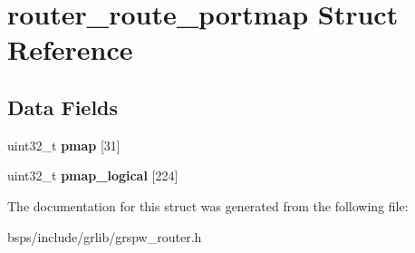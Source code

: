 \hypertarget{structrouter__route__portmap}{}\section{router\+\_\+route\+\_\+portmap Struct Reference}
\label{structrouter__route__portmap}
\subsection*{Data Fields}
\begin{DoxyCompactItemize}
\item 
\mbox{\label{structrouter__route__portmap_af13ac469fd9db21f44e7544dff9d2dd4}} 
uint32\+\_\+t {\bfseries pmap} \mbox{[}31\mbox{]}
\item 
\mbox{\label{structrouter__route__portmap_aa80a30e41f906b9ec3fdc50e2f09debe}} 
uint32\+\_\+t {\bfseries pmap\+\_\+logical} \mbox{[}224\mbox{]}
\end{DoxyCompactItemize}


The documentation for this struct was generated from the following file\+:\begin{DoxyCompactItemize}
\item 
bsps/include/grlib/grspw\+\_\+router.\+h\end{DoxyCompactItemize}
